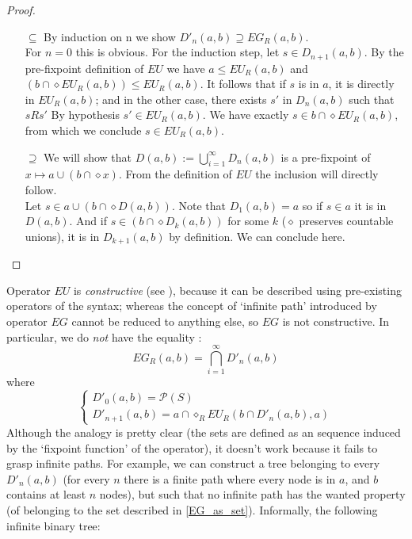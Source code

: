 \documentclass[11pt]{article}
\begin{document}
\begin{proof}
    \begin{itemize}
        \item[$\subseteq$] By induction on n we show $D'_n(a,b) \supseteq EG_R(a,b)$.\\ For $n=0$ this is obvious. For the induction step, let $s\in D_{n+1}(a,b)$. By the pre-fixpoint definition of $EU$ we have $a\leq EU_R(a,b)$ and $(b\cap\diamond EU_R(a,b))\leq EU_R(a,b)$. It follows that if $s$ is in $a$, it is directly in $EU_R(a,b)$; and in the other case, there exists $s'$ in $D_n(a,b)$ such that $sRs'$ By hypothesis $s'\in EU_R(a,b)$. We have exactly $s\in b\cap\diamond EU_R(a,b)$, from which we conclude $s\in EU_R(a,b)$.
        \item[$\supseteq$] We will show that $D(a,b) := \bigcup_{i=1}^{\infty}D_n(a,b)$ is a pre-fixpoint of $x \mapsto a \cup (b \cap \diamond x)$. From the definition of $EU$ the inclusion will directly follow.\\ Let $s\in a \cup (b \cap \diamond D(a,b))$. Note that $D_1(a,b)=a$ so if $s\in a$ it is in $D(a,b)$. And if $s\in (b \cap \diamond D_k(a,b))$ for some $k$ ($\diamond$ preserves countable unions), it is in $D_{k+1}(a,b)$ by definition. We can conclude here.
    \end{itemize}
\end{proof}

Operator $EU$ is \emph{constructive} (see \cite{Santo08}), because it can be described using pre-existing operators of the syntax; whereas the concept of `infinite path' introduced by operator $EG$ cannot be reduced to anything else, so $EG$ is not constructive. In particular, we do \emph{not} have the equality : \[EG_R(a,b)=\bigcap_{i=1}^\infty D'_n(a,b)\] where
\begin{equation*}
    \begin{cases}
        D'_0(a,b)=\mathcal{P}(S)\\
        D'_{n+1}(a,b)=a\cap\diamond_R EU_R(b\cap D'_n(a,b),a)
    \end{cases}
\end{equation*}
Although the analogy is pretty clear (the sets are defined as an sequence induced by the `fixpoint function' of the operator), it doesn't work because it fails to grasp infinite paths. For example, we can construct a tree belonging to every $D'_n(a,b)$ (for every $n$ there is a finite path where every node is in $a$, and $b$ contains at least $n$ nodes), but such that no infinite path has the wanted property (of belonging to the set described in \ref{EG_as_set}). Informally, the following infinite binary tree:
\end{document}
